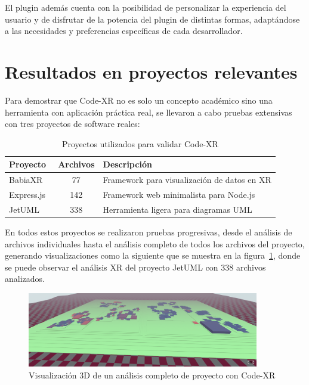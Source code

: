 \documentclass[a4paper, 12pt]{book}
\begin{document}
El plugin además cuenta con la posibilidad de personalizar la experiencia del usuario y de disfrutar de la potencia del plugin de distintas formas, adaptándose a las necesidades y preferencias específicas de cada desarrollador.

\section{Resultados en proyectos relevantes}
\label{sec:resultados-proyectos}

Para demostrar que Code-XR no es solo un concepto académico sino una herramienta con aplicación práctica real, se llevaron a cabo pruebas extensivas con tres proyectos de software reales:

\begin{table}[h]
\centering
\begin{tabular}{|l|c|l|}
\hline
\textbf{Proyecto} & \textbf{Archivos} & \textbf{Descripción} \\
\hline
BabiaXR~\cite{moreno2022babiaxr} & 77 & Framework para visualización de datos en XR \\
\hline
Express.js~\cite{expressjs2022web} & 142 & Framework web minimalista para Node.js \\
\hline
JetUML~\cite{jetuml2022web} & 338 & Herramienta ligera para diagramas UML \\
\hline
\end{tabular}
\caption{Proyectos utilizados para validar Code-XR}
\label{tab:proyectos-validacion}
\end{table}

En todos estos proyectos se realizaron pruebas progresivas, desde el análisis de archivos individuales hasta el análisis completo de todos los archivos del proyecto, generando visualizaciones como la siguiente que se muestra en la figura~\ref{fig:analisis-proyecto-completo}, donde se puede observar el análisis XR del proyecto JetUML con 338 archivos analizados.


\begin{figure}[H]
\centering
\includegraphics[width=0.9\textwidth]{img/analisis-proyecto-completo.png}
\caption{Visualización 3D de un análisis completo de proyecto con Code-XR}
\label{fig:analisis-proyecto-completo}
\end{figure}
\end{document}
